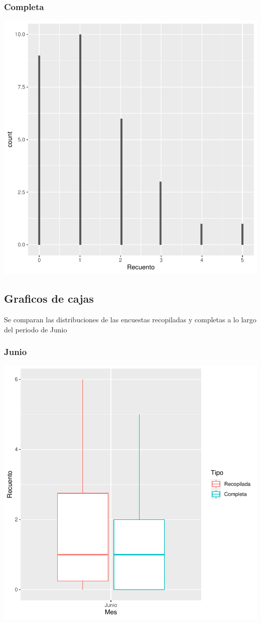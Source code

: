\documentclass{article}
\begin{document}
\subsubsection{Completa}

\includegraphics{seguimento2-094}

\subsection{Graficos de cajas}
Se comparan las distribuciones de las encuestas recopiladas y completas a lo largo del periodo de Junio

\subsubsection{Junio}

\includegraphics{seguimento2-095}
\end{document}
